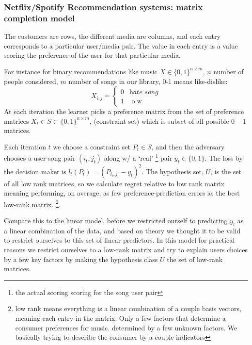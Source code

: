 \documentclass[11pt]{article}
\theoremstyle{quest}
\begin{document}
\subsubsection{Netflix/Spotify Recommendation systems: matrix completion model}
The customers are rows, the different media are columns, and each entry corresponds to a particular user/media pair. The value in each entry is a value scoring the preference of the user for that particular media. 

For instance for binary recommendations like music $X\in \{0,1\}^{n\times m}$, $n$ number of people considered, $m$ number of songs in our library, 0-1 means like-dislike:
\[X_{i,j} = \begin{cases} 0 & \textit{hate song}\\ 1 & \text{ o.w}\end{cases}\]
At each iteration the learner picks a preference matrix from the set of preference matrices $X_t \in S\subset \{0,1\}^{n\times m}$, (constraint set) which is subset of all possible $0-1$ matrices. 

Each iteration $t$ we choose a constraint set $P_t\in S$, and then the adversary chooses a user-song pair $(i_t, j_t)$ along w/ a `real' \footnote{the actual scoring scoring for the song user pair} pair $y_t\in \{0,1\}$. The loss by the decision maker is $l_t(P_t)=(P_{{i_t},{j_t}}-y_t)^2$. The hypothesis set, $U$, is the set of all low rank matrices, so we calculate regret relative to low rank matrix meaning  performing, on average, as few preference-prediction errors as the best low-rank matrix.  \footnote{low rank means everything is a linear combination of a couple basis vectors, meaning each entry in the matrix. Only a few factors that determine a consumer preferences for music.  determined by a few unknown factors. We basically trying to describe the consumer by a couple indicators}. 

Compare this to the linear model, before we restricted ourself to predicting $y_t$ as a linear combination of the data, and based on theory we thought it to be valid to restrict ourselves to this set of linear predictors. In this model for practical reasons we restrict ourselves to a low-rank matrix and try to explain users choices by a few key factors by making the hypothesis class $U$ the set of low-rank matrices. 
\end{document}
